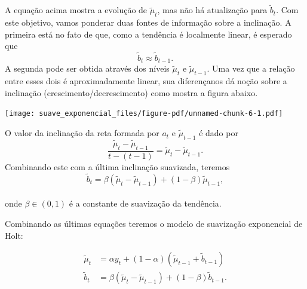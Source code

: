 \documentclass[
  letterpaper,
  DIV=11,
  numbers=noendperiod]{scrartcl}
\theoremstyle{plain}
\theoremstyle{plain}
\theoremstyle{definition}
\theoremstyle{definition}
\theoremstyle{remark}
\begin{document}
A equação acima mostra a evolução de \(\tilde{\mu}_t\), mas não há
atualização para \(\tilde{b}_t\). Com este objetivo, vamos ponderar duas
fontes de informação sobre a inclinação. A primeira está no fato de que,
como a tendência é localmente linear, é esperado que
\[\tilde{b}_t\approx \tilde{b}_{t-1}.\] A segunda pode ser obtida
através dos níveis \(\tilde{\mu}_t\) e \(\tilde{\mu}_{t-1}\). Uma vez
que a relação entre esses dois é aproximadamente linear, sua
diferençanos dá noção sobre a inclinação (crescimento/decrescimento)
como mostra a figura abaixo.

\texttt{[image: suave\_exponencial\_files/figure-pdf/unnamed-chunk-6-1.pdf]}

O valor da inclinação da reta formada por \(a_t\) e
\(\tilde{\mu}_{t-1}\) é dado por
\[\frac{\tilde{\mu}_t - \tilde{\mu}_{t-1}}{t - (t-1)} = \tilde{\mu}_t - \tilde{\mu}_{t-1}.\]
Combinando este com a última inclinação suavizada, teremos
\[\tilde{b}_t = \beta (\tilde{\mu}_t - \tilde{\mu}_{t-1}) + (1-\beta)\tilde{\mu}_{t-1},\]\\
onde \(\beta\in(0,1)\) é a constante de suavização da tendência.

Combinando as últimas equações teremos o modelo de suavização
exponencial de Holt:

\[\begin{align*}
    \tilde{\mu}_t &= \alpha y_t + (1-\alpha)\left( \tilde{\mu}_{t-1} + \tilde{b}_{t-1}\right) \\
    \tilde{b}_t &= \beta (\tilde{\mu}_t - \tilde{\mu}_{t-1}) + (1-\beta)\tilde{b}_{t-1}.
    \end{align*}\]
\end{document}
